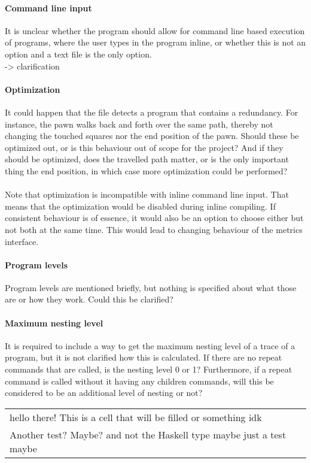 \paragraph{Command line input}
It is unclear whether the program should allow for command line based execution of programs, where the user types in the program inline, or whether this is not an option and a text file is the only option. \\
-> clarification

\paragraph{Optimization}
It could happen that the file detects a program that contains a redundancy. For instance, the pawn walks back and forth over the same path, thereby not changing the touched squares nor the end position of the pawn. Should these be optimized out, or is this behaviour out of scope for the project? And if they should be optimized, does the travelled path matter, or is the only important thing the end position, in which case more optimization could be performed?\\~\\
Note that optimization is incompatible with inline command line input. That means that the optimization would be disabled during inline compiling. If consistent behaviour is of essence, it would also be an option to choose either but not both at the same time. This would lead to changing behaviour of the metrics interface. 

\paragraph{Program levels}
Program levels are mentioned briefly, but nothing is specified about what those are or how they work. Could this be clarified?

\paragraph{Maximum nesting level}
It is required to include a way to get the maximum nesting level of a trace of a program, but it is not clarified how this is calculated. If there are no repeat commands that are called, is the nesting level 0 or 1? Furthermore, if a repeat command is called without it having any children commands, will this be considered to be an additional level of nesting or not?

\begin{table}[h]
    \centering
    \begin{tabular}{>{\columncolor{lightgreen}}l}
        hello there! This is a cell that will be filled or something idk\\ Another test? Maybe? and not the Haskell type maybe just a test maybe
    \end{tabular}
\end{table}
